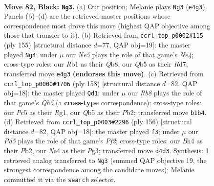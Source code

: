 \documentclass[11pt]{article}
\begin{document}
\clearpage

\begin{figure}[p]\centering
\begin{subfigure}{0.46\textwidth}\centering
\resizebox{\linewidth}{!}{%
\newchessgame
\chessboard[
  setfen={8/6k1/8/Pqp2p2/3pnPpb/4P3/R1QB4/1r1N2K1 b - - 8 82},
  showmover=false,
  pgfstyle=straightmove, color=movearrow, markmove={e4-g3}
]}
\caption{}
\end{subfigure}\hfill
\begin{subfigure}{0.46\textwidth}\centering
\resizebox{\linewidth}{!}{%
\newchessgame
\chessboard[
  setfen={1q4k1/3r4/3p2p1/2pPn2p/2P1N2P/1PQ5/4R3/1K6 b - - 6 78},
  showmover=false,
  pgfstyle=straightmove, color=movearrow, markmove={e5-g4}
]}
\caption{}
\end{subfigure}
\\[4pt]
\begin{subfigure}{0.46\textwidth}\centering
\resizebox{\linewidth}{!}{%
\newchessgame
\chessboard[
  setfen={8/8/1p1N1r1p/3P3Q/2Pnpq2/Pp6/1P3k2/K5R1 w - - 17 80},
  showmover=false,
  pgfstyle=straightmove, color=movearrow, markmove={h5-d1}
]}
\caption{}
\end{subfigure}\hfill
\begin{subfigure}{0.46\textwidth}\centering
\resizebox{\linewidth}{!}{%
\newchessgame
\chessboard[
  setfen={5r1k/8/8/1p3qN1/p2PQp1P/P5P1/1P3P1K/8 w - - 1 79},
  showmover=false,
  pgfstyle=straightmove, color=movearrow, markmove={f2-f3}
]}
\caption{}
\end{subfigure}
\caption{\textbf{Move 82, Black: \texttt{Ng3}.} (a) Our position; Melanie plays \texttt{Ng3} (\texttt{e4g3}). Panels (b)--(d) are the retrieved master positions whose correspondence most drove this move (highest QAP objective among those that transfer to it). (b) Retrieved from \texttt{ccrl\_top\_p0002\#115} (ply 155) [structural distance $d$=77, QAP obj=19]: the master played \texttt{Ng4}; under $\mu$ our \emph{Ne5} plays the role of that game's \emph{Ne4}; cross-type roles: our \emph{R}b1 as their \emph{Q}b8, our \emph{Q}b5 as their \emph{R}d7; transferred move \texttt{e4g3} \textbf{(endorses this move)}. (c) Retrieved from \texttt{ccrl\_top\_p0000\#1706} (ply 158) [structural distance $d$=82, QAP obj=18]: the master played \texttt{Qd1}; under $\mu$ our \emph{Rb8} plays the role of that game's \emph{Qh5} (a \textbf{cross-type} correspondence); cross-type roles: our \emph{P}c5 as their \emph{R}g1, our \emph{Q}b5 as their \emph{P}b2; transferred move \texttt{b1b4}. (d) Retrieved from \texttt{ccrl\_top\_p0003\#2296} (ply 156) [structural distance $d$=82, QAP obj=18]: the master played \texttt{f3}; under $\mu$ our \emph{Pd5} plays the role of that game's \emph{Pf2}; cross-type roles: our \emph{B}h4 as their \emph{P}b2, our \emph{N}e4 as their \emph{P}g3; transferred move \texttt{d4d3}. Synthesis: 1 retrieved analog transferred to \texttt{Ng3} (summed QAP objective 19, the strongest correspondence among the candidate moves); Melanie committed it via the \texttt{search} selector.}
\label{fig:thought-m163}
\end{figure}
\end{document}
